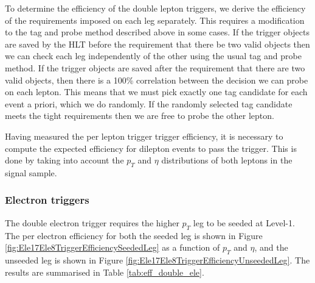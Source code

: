  
To determine the efficiency of the double lepton triggers, we derive the efficiency of the requirements imposed on each leg separately.
This requires a modification to the tag and probe method described above in some cases.
If the trigger objects are saved by the HLT before the requirement that there be two valid objects then
we can check each leg independently of the other using the usual tag and probe method.
If the trigger objects are saved after the requirement that there are two valid objects, then there is 
a 100\% correlation between the decision we can probe on each lepton.
This means that we must pick exactly one tag candidate for each event a priori, which we do 
randomly. 
If the randomly selected tag candidate meets the tight requirements then we are free to 
probe the other lepton.

Having measured the per lepton trigger trigger efficiency,
it is necessary to compute the expected efficiency for dilepton events to pass the trigger.
This is done by taking into account the $p_{T}$ and $\eta$ distributions
of both leptons in the signal sample.

\subsubsection{Electron triggers}
The double electron trigger requires the higher $p_T$ leg to be seeded at Level-1.
The per electron efficiency for both the seeded leg is shown in 
Figure \ref{fig:Ele17Ele8TriggerEfficiencySeededLeg} as a function of $p_{T}$ and $\eta$, 
and the unseeded leg is shown in Figure \ref{fig:Ele17Ele8TriggerEfficiencyUnseededLeg}.
The results are summarised in Table \ref{tab:eff_double_ele}. 

